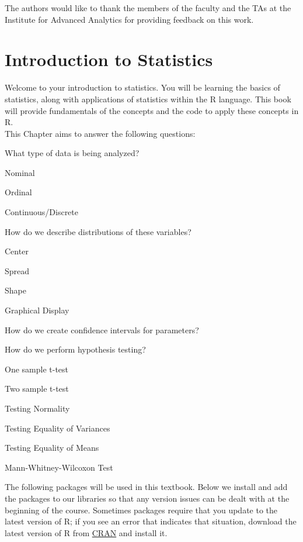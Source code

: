 \documentclass[
  letterpaper,
  DIV=11,
  numbers=noendperiod]{scrreprt}
\begin{document}
The authors would like to thank the members of the faculty and the TAs
at the Institute for Advanced Analytics for providing feedback on this
work.


\hypertarget{sec-intro-stat}{%
\chapter{Introduction to Statistics}\label{sec-intro-stat}}

Welcome to your introduction to statistics. You will be learning the
basics of statistics, along with applications of statistics within the R
language. This book will provide fundamentals of the concepts and the
code to apply these concepts in R.\\
This Chapter aims to answer the following questions:

What type of data is being analyzed?

Nominal

Ordinal

Continuous/Discrete

How do we describe distributions of these variables?

Center

Spread

Shape

Graphical Display

How do we create confidence intervals for parameters?

How do we perform hypothesis testing?

One sample t-test

Two sample t-test

Testing Normality

Testing Equality of Variances

Testing Equality of Means

Mann-Whitney-Wilcoxon Test

The following packages will be used in this textbook. Below we install
and add the packages to our libraries so that any version issues can be
dealt with at the beginning of the course. Sometimes packages require
that you update to the latest version of R; if you see an error that
indicates that situation, download the latest version of R from
\href{https://cran.r-project.org}{CRAN} and install it.
\end{document}
